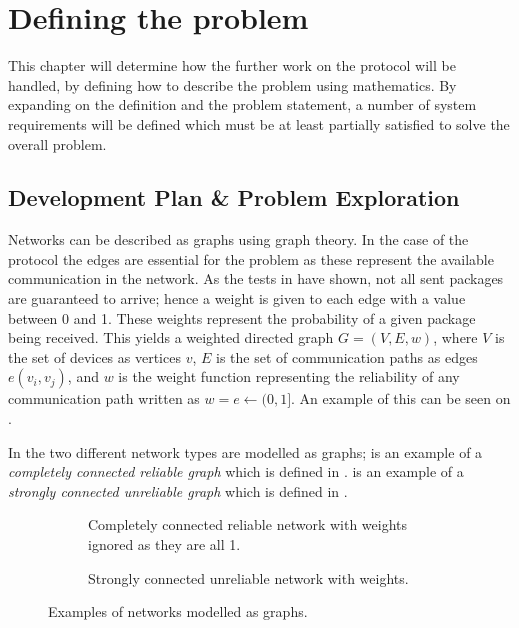 \chapter{Defining the problem}
This chapter will determine how the further work on the protocol will be handled, by defining how to describe the problem using mathematics. 
By expanding on the definition and the problem statement, a number of system requirements will be defined which must be at least partially satisfied to solve the overall problem.

\section{Development Plan \& Problem Exploration}\label{chp:Problems}
Networks can be described as graphs using graph theory. 
In the case of the protocol the edges are essential for the problem as these represent the available communication in the network.
As the tests in  have shown, not all sent packages are guaranteed to arrive; hence a weight is given to each edge with a value between 0 and 1.
These weights represent the probability of a given package being received.
This yields a weighted directed graph $G = (V, E, w)$, where $V$ is the set of devices as vertices $v$, $E$ is the set of communication paths as edges $e(v_i, v_j)$, and $w$ is the weight function representing the reliability of any communication path written as $w = e \leftarrow (0,1]$. 
An example of this can be seen on .

In  the two different network types are modelled as graphs; 
 is an example of a \emph{completely connected reliable graph} which is defined in .
 is an example of a \emph{strongly connected unreliable graph} which is defined in .

\begin{figure}[H]
    \footnotesize
    \begin{subfigure}{0.47\linewidth}
        \centering
        
        \caption{Completely connected reliable network with weights ignored as they are all 1.}
        \label{fig:ccrcnetworkgraph}
    \end{subfigure}\hfill
    \begin{subfigure}{0.47\linewidth}
        \centering
        
        \caption{Strongly connected unreliable network with weights.}
        \label{fig:network}
    \end{subfigure}
    \caption{Examples of networks modelled as graphs.}
    \label{fig:examplenetworkgraphs}
    \vspace{-20pt}
\end{figure}

